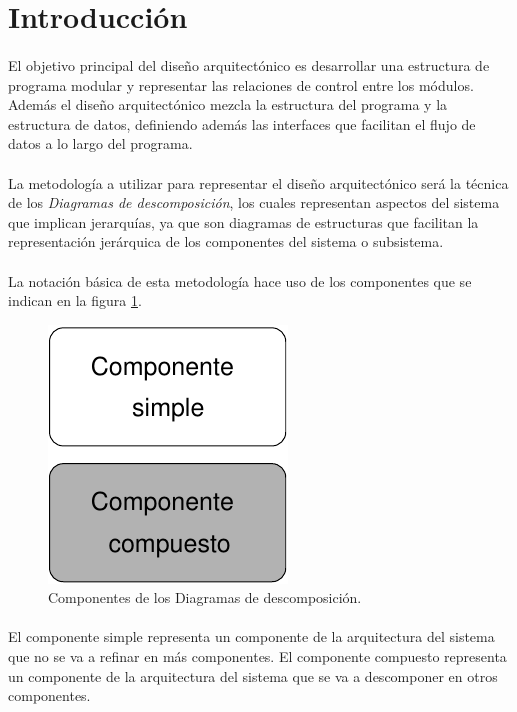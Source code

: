 \section{Introducción}

  \paragraph{}El objetivo principal del diseño arquitectónico es desarrollar una
  estructura de programa modular y representar las relaciones de control
  entre los módulos. Además el diseño arquitectónico mezcla la estructura del
  programa y la estructura de datos, definiendo además las interfaces que
  facilitan el flujo de datos a lo largo del programa.

  \paragraph{}La metodología a utilizar para representar el diseño
  arquitectónico será la técnica de los \textit{Diagramas de descomposición},
  los cuales representan aspectos del sistema que implican jerarquías, ya que
  son diagramas de estructuras que facilitan la representación jerárquica de los
  componentes del sistema o subsistema.

  \paragraph{}La notación básica de esta metodología hace uso de los componentes
  que se indican en la figura \ref{diagramaComponentes}.

  \begin{figure}[!ht]
            \begin{center}
            \includegraphics[]{11.Disenyo_Arquitectonico/11.1.Introduccion/Diagramas/componentes.pdf}
            \caption{Componentes de los Diagramas de descomposición.}
            \label{diagramaComponentes}
            \end{center}
         \end{figure}

  \paragraph{}El componente simple representa un componente de la arquitectura
  del sistema que no se va a refinar en más componentes. El componente
  compuesto representa un componente de la arquitectura del sistema que
  se va a descomponer en otros componentes.
